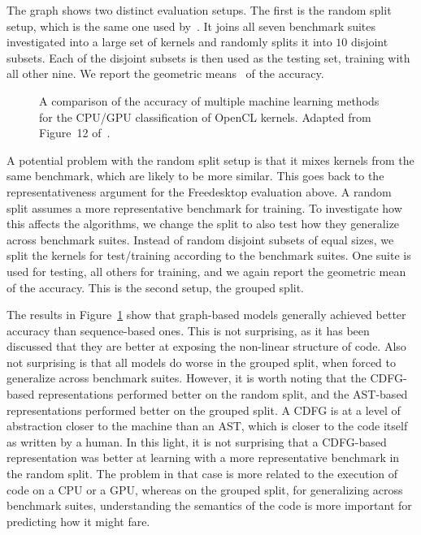 The graph shows two distinct evaluation setups.
The first is the random split setup, which is the same one used by~\cite{cummins_pact17,inst2vec}.
It joins all seven benchmark suites investigated into a large set of kernels and randomly splits it into $10$ disjoint subsets.
Each of the disjoint subsets is then used as the testing set, training with all other nine.
We report the geometric means~\cite{fleming1986gmean} of the accuracy.

\begin{figure}[h]
	\centering
\resizebox{0.95\textwidth}{!}{
     
     }
   \caption{A comparison of the accuracy of multiple machine learning methods for the \ac{CPU}/\ac{GPU} classification of OpenCL kernels. Adapted from Figure~12 of~\cite{brauckmann_cc20}.}
   \label{fig:graph_representations_code}
\end{figure}

A potential problem with the random split setup is that it mixes kernels from the same benchmark, which are likely to be more similar. 
This goes back to the representativeness argument for the Freedesktop evaluation above.
A random split assumes a more representative benchmark for training.
To investigate how this affects the algorithms, we change the split to also test how they generalize across benchmark suites.
Instead of random disjoint subsets of equal sizes, we split the kernels for test/training according to the benchmark suites.
One suite is used for testing, all others for training, and we again report the geometric mean of the accuracy.
This is the second setup, the grouped split.

The results in Figure~\ref{fig:graph_representations_code} show that graph-based models generally achieved better accuracy than sequence-based ones.
This is not surprising, as it has been discussed that they are better at exposing the non-linear structure of code.
Also not surprising is that all models do worse in the grouped split, when forced to generalize across benchmark suites.
However, it is worth noting that the \ac{CDFG}-based representations performed better on the random split, and the \ac{AST}-based representations performed better on the grouped split.
A \ac{CDFG} is at a level of abstraction closer to the machine than an \ac{AST}, which is closer to the code itself as written by a human.
In this light, it is not surprising that a \ac{CDFG}-based representation was better at learning with a more representative benchmark in the random split.
The problem in that case is more related to the execution of code on a \ac{CPU} or a \ac{GPU}, whereas on the grouped split, for generalizing across benchmark suites, understanding the semantics of the code is more important for predicting how it might fare.

